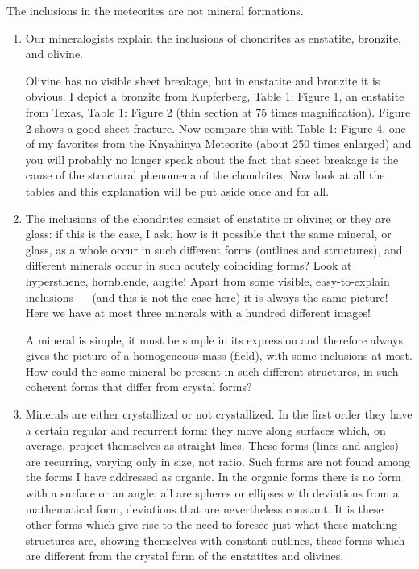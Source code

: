 \documentclass[a4paper, 12pt, oneside]{article}
\begin{document}
The inclusions in the meteorites are not mineral formations.
\begin{enumerate}
    \item Our mineralogists explain the inclusions of chondrites as enstatite, bronzite, and olivine. 
    
    Olivine has no visible sheet breakage, but in enstatite and bronzite it is obvious. I depict a bronzite from Kupferberg, Table 1: Figure 1, an enstatite from Texas, Table 1: Figure 2 (thin section at 75 times magnification). Figure 2 shows a good sheet fracture. Now compare this with Table 1: Figure 4, one of my favorites from the Knyahinya Meteorite (about 250 times enlarged) and you will probably no longer speak about the fact that sheet breakage is the cause of the structural phenomena of the chondrites. Now look at all the tables and this explanation will be put aside once and for all.
    \item The inclusions of the chondrites consist of enstatite or olivine; or they are glass: if this is the case, I ask, how is it possible that the same mineral, or glass, as a whole occur in such different forms (outlines and structures), and different minerals occur in such acutely coinciding forms? Look at hypersthene, hornblende, augite! Apart from some visible, easy-to-explain inclusions --- (and this is not the case here) it is always the same picture! Here we have at most three minerals with a hundred different images!
    
    A mineral is simple, it must be simple in its expression and therefore always gives the picture of a homogeneous mass (field), with some inclusions at most. How could the same mineral be present in such different structures, in such coherent forms that differ from crystal forms?
    \item Minerals are either crystallized or not crystallized. In the first order they have a certain regular and recurrent form: they move along surfaces which, on average, project themselves as straight lines. These forms (lines and angles) are recurring, varying only in size, not ratio. Such forms are not found among the forms I have addressed as organic. In the organic forms there is no form with a surface or an angle; all are spheres or ellipses with deviations from a mathematical form, deviations that are nevertheless constant. It is these other forms which give rise to the need to foresee just what these matching structures are, showing themselves with constant outlines, these forms which are different from the crystal form of the enstatites and olivines.
    

\end{enumerate}
\end{document}
